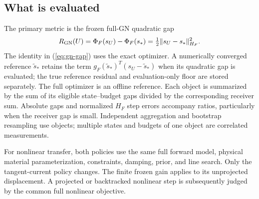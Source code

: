 \subsection{What is evaluated}
The primary metric is the frozen full-GN quadratic gap
\begin{equation}\label{eq:gn-gap}
R_{\rm GN}(U)=\Phi_F(s_U)-\Phi_F(s_*)
=\tfrac12\|s_U-s_*\|_{H_F}^{2}.
\end{equation}
The identity in (\ref{eq:gn-gap}) uses the exact optimizer. A numerically converged reference $\tilde s_*$ retains the term $g_F(\tilde s_*)^T(s_U-\tilde s_*)$ when its quadratic gap is evaluated; the true reference residual and evaluation-only floor are stored separately. The full optimizer is an offline reference. Each object is summarized by the sum of its eligible state--budget gaps divided by the corresponding receiver sum. Absolute gaps and normalized $H_F$ step errors accompany ratios, particularly when the receiver gap is small. Independent aggregation and bootstrap resampling use objects; multiple states and budgets of one object are correlated measurements.

For nonlinear transfer, both policies use the same full forward model, physical material parameterization, constraints, damping, prior, and line search. Only the tangent-current policy changes. The finite frozen gain applies to its unprojected displacement. A projected or backtracked nonlinear step is subsequently judged by the common full nonlinear objective.
